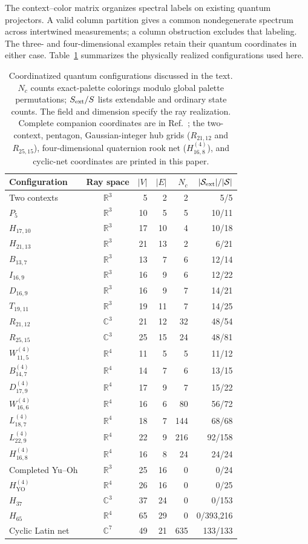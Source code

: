 \documentclass[aps,pra,reprint,superscriptaddress,longbibliography,nofootinbib,floatfix,10pt]{revtex4-2}
\theoremstyle{definition}\newtheorem{definition}[theorem]{Definition}
\theoremstyle{remark}\newtheorem{remark}[theorem]{Remark}
\newcommand{\Sc}{\mathcal S}\newcommand{\Cc}{\mathcal C}
\newcommand{\YO}{\mathrm{YO}}\newcommand{\ip}[2]{\langle #1,#2\rangle}
\begin{document}
The context--color matrix organizes spectral labels on existing quantum projectors. A valid column partition gives a common nondegenerate spectrum across intertwined measurements; a column obstruction excludes that labeling. The three- and four-dimensional examples retain their quantum coordinates in either case. Table~\ref{tab:master-matrix-synthesis} summarizes the physically realized configurations used here.

\begin{table}[t]
\centering\small
\caption{Coordinatized quantum configurations discussed in the text. $N_c$ counts exact-palette colorings modulo global palette permutations; $S_{\rm ext}/S$ lists extendable and ordinary state counts. The field and dimension specify the ray realization. Complete companion coordinates are in Ref.~\cite{svozil2026contexts,supplement}; the two-context, pentagon, Gaussian-integer hub grids ($R_{21,12}$ and $R_{25,15}$), four-dimensional quaternion rook net ($H_{16,8}^{(4)}$), and cyclic-net coordinates are printed in this paper.}\label{tab:master-matrix-synthesis}
\begin{tabular}{lcrrrr}\toprule
Configuration & Ray space & $|V|$ & $|E|$ & $N_c$ & $|\Sc_{\rm ext}|/|\Sc|$\\\midrule
Two contexts & $\mathbb R^3$ &5&2&2&5/5\\
$P_5$ & $\mathbb R^3$ &10&5&5&10/11\\
$H_{17,10}$ & $\mathbb R^3$ &17&10&4&10/18\\
$H_{21,13}$ & $\mathbb R^3$ &21&13&2&6/21\\
$B_{13,7}$ & $\mathbb R^3$ &13&7&6&12/14\\
$I_{16,9}$ & $\mathbb R^3$ &16&9&6&12/22\\
$D_{16,9}$ & $\mathbb R^3$ &16&9&7&14/21\\
$T_{19,11}$ & $\mathbb R^3$ &19&11&7&14/25\\
$R_{21,12}$ & $\mathbb C^3$ &21&12&32&48/54\\
$R_{25,15}$ & $\mathbb C^3$ &25&15&24&48/81\\
$W_{11,5}^{(4)}$ & $\mathbb R^4$ &11&5&5&11/12\\
$B_{14,7}^{(4)}$ & $\mathbb R^4$ &14&7&6&13/15\\
$D_{17,9}^{(4)}$ & $\mathbb R^4$ &17&9&7&15/22\\
$W_{16,6}^{(4)}$ & $\mathbb R^4$ &16&6&80&56/72\\
$L_{18,7}^{(4)}$ & $\mathbb R^4$ &18&7&144&68/68\\
$L_{22,9}^{(4)}$ & $\mathbb R^4$ &22&9&216&92/158\\
$H_{16,8}^{(4)}$ & $\mathbb R^4$ &16&8&24&24/24\\
Completed Yu--Oh & $\mathbb R^3$ &25&16&0&0/24\\
$H_{\YO}^{(4)}$ & $\mathbb R^4$ &26&16&0&0/25\\
$H_{37}$ & $\mathbb C^3$ &37&24&0&0/153\\
$H_{65}$ & $\mathbb R^4$ &65&29&0&0/393,216\\
Cyclic Latin net & $\mathbb C^7$ &49&21&635&133/133\\\bottomrule
\end{tabular}
\end{table}
\end{document}

